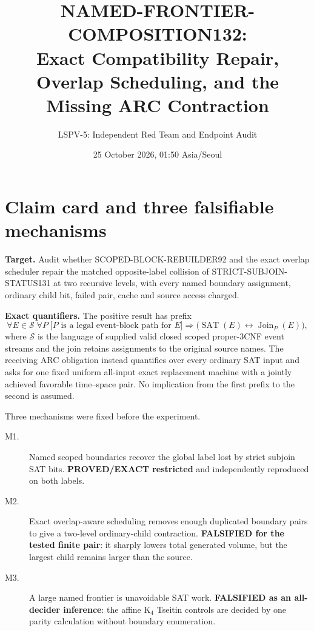 \documentclass[11pt]{article}
\title{NAMED-FRONTIER-COMPOSITION132:\\Exact Compatibility Repair, Overlap Scheduling, and the Missing ARC Contraction}
\author{LSPV-5: Independent Red Team and Endpoint Audit}
\date{25 October 2026, 01:50 Asia/Seoul}
\newcommand{\SAT}{\operatorname{SAT}}
\begin{document}
\maketitle

\begin{center}
\end{center}

\section{Claim card and three falsifiable mechanisms}
\textbf{Target.}  Audit whether SCOPED-BLOCK-REBUILDER92 and the exact
overlap scheduler repair the matched opposite-label collision of
STRICT-SUBJOIN-STATUS131 at two recursive levels, with every named boundary
assignment, ordinary child bit, failed pair, cache and source access charged.

\textbf{Exact quantifiers.}  The positive result has prefix
\[
 \forall E\in\mathcal S\;\forall P\;\bigl[
 P\text{ is a legal event-block path for }E\bigr]\Longrightarrow
 \bigl(\SAT(E)\leftrightarrow\operatorname{Join}_{P}(E)\bigr),
\]
where $\mathcal S$ is the language of supplied valid closed scoped proper-3CNF
event streams and the join retains assignments to the original source names.
The receiving ARC obligation instead quantifies over every ordinary SAT input
and asks for one fixed uniform all-input exact replacement machine with a
jointly achieved favorable time--space pair.  No implication from the first
prefix to the second is assumed.

Three mechanisms were fixed before the experiment.
\begin{description}
\item[M1.] Named scoped boundaries recover the global label lost by strict
subjoin SAT bits.  \textbf{PROVED/EXACT restricted} and independently
reproduced on both labels.
\item[M2.] Exact overlap-aware scheduling removes enough duplicated boundary
pairs to give a two-level ordinary-child contraction.  \textbf{FALSIFIED for
the tested finite pair}: it sharply lowers total generated volume, but the
largest child remains larger than the source.
\item[M3.] A large named frontier is unavoidable SAT work.  \textbf{FALSIFIED
as an all-decider inference}: the affine K$_4$ Tseitin controls are decided by
one parity calculation without boundary enumeration.
\end{description}
\end{document}

